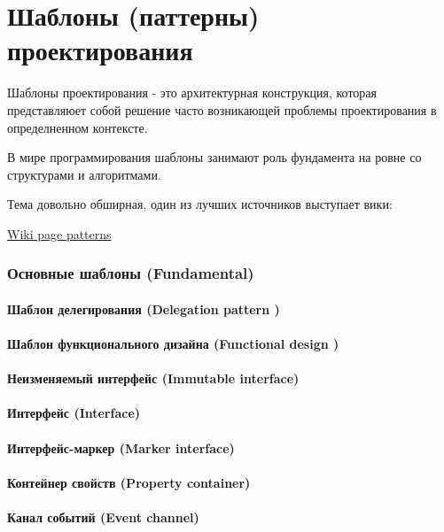 \part{Шаблоны (паттерны) проектирования}

Шаблоны проектирования - это архитектурная конструкция, которая представляюет собой решение часто возникающей проблемы проектирования в определненном контексте.

В мире программирования шаблоны занимают роль фундамента на ровне со структурами и алгоритмами.

Тема довольно обширная, один из лучших источников выступает вики:

\href{https://ru.wikipedia.org/wiki/%D0%A8%D0%B0%D0%B1%D0%BB%D0%BE%D0%BD_%D0%BF%D1%80%D0%BE%D0%B5%D0%BA%D1%82%D0%B8%D1%80%D0%BE%D0%B2%D0%B0%D0%BD%D0%B8%D1%8F}{Wiki page patterns}

\section{Основные шаблоны (Fundamental)}

\subsection{Шаблон делегирования (Delegation pattern )}
\subsection{Шаблон функционального дизайна (Functional design )}
\subsection{Неизменяемый интерфейс (Immutable interface)}
\subsection{Интерфейс (Interface)}
\subsection{Интерфейс-маркер (Marker interface)}
\subsection{Контейнер свойств (Property container)}
\subsection{Канал событий (Event channel)}

